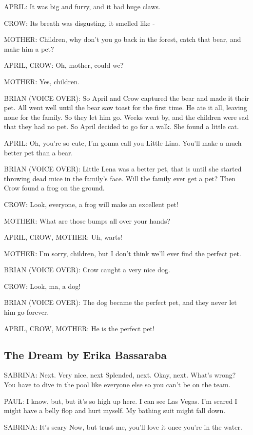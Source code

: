 APRIL:
It was big and furry, and it had huge claws.

CROW:
Its breath was disgusting, it smelled like -

MOTHER:
Children, why don't you go back in the forest, catch that bear, and make him a pet?

APRIL, CROW:
Oh, mother, could we?

MOTHER:
Yes, children.

BRIAN (VOICE OVER):
So April and Crow captured the bear and made it their pet.
All went well until the bear saw toast for the first time.
He ate it all, leaving none for the family.
So they let him go.
Weeks went by, and the children were sad that they had no pet.
So April decided to go for a walk.
She found a little cat.

APRIL:
Oh, you're so cute, I'm gonna call you Little Lina.
You'll make a much better pet than a bear.

BRIAN (VOICE OVER):
Little Lena was a better pet, that is until she started throwing dead mice in the family's face.
Will the family ever get a pet?
Then Crow found a frog on the ground.

CROW:
Look, everyone, a frog will make an excellent pet!

MOTHER:
What are those bumps all over your hands?

APRIL, CROW, MOTHER:
Uh, warts!

MOTHER:
I'm sorry, children, but I don't think we'll ever find the perfect pet.

BRIAN (VOICE OVER):
Crow caught a very nice dog.

CROW:
Look, ma, a dog!

BRIAN (VOICE OVER):
The dog became the perfect pet, and they never let him go forever.

APRIL, CROW, MOTHER:
He is the perfect pet!

\subsection{The Dream by Erika Bassaraba}

SABRINA:
Next.
Very nice, next
Splended, next.
Okay, next.
What's wrong?
You have to dive in the pool like everyone else so you can't be on the team.

PAUL:
I know, but, but it's so high up here.
I can see Las Vegas.
I'm scared I might have a belly flop and hurt myself.
My bathing suit might fall down.

SABRINA:
It's scary Now, but trust me, you'll love it once you're in the water.

